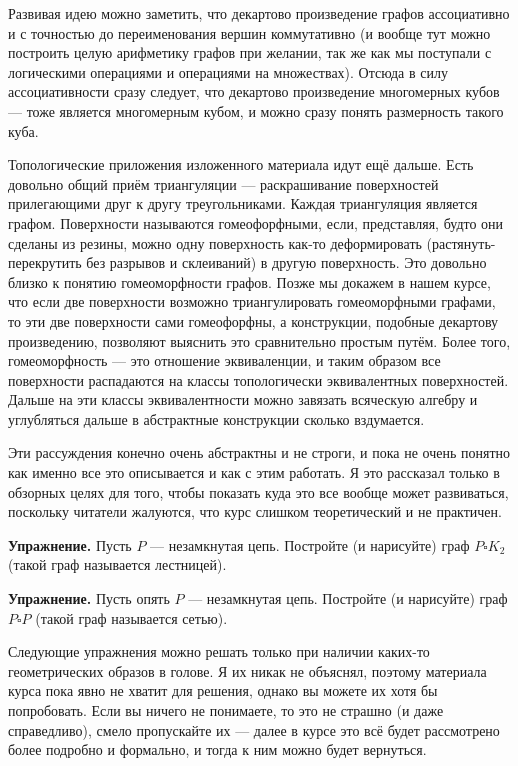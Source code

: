 Развивая идею можно заметить, что декартово произведение графов ассоциативно и с точностью до переименования вершин коммутативно (и вообще тут можно построить целую арифметику графов при желании, так же как мы поступали с логическими операциями и операциями на множествах). Отсюда в силу ассоциативности сразу следует, что декартово произведение многомерных кубов — тоже является многомерным кубом, и можно сразу понять размерность такого куба.

Топологические приложения изложенного материала идут ещё дальше. Есть довольно общий приём триангуляции — раскрашивание поверхностей прилегающими друг к другу треугольниками. Каждая триангуляция является графом. Поверхности называются гомеофорфными, если, представляя, будто они сделаны из резины, можно одну поверхность как-то деформировать (растянуть-перекрутить без разрывов и склеиваний) в другую поверхность. Это довольно близко к понятию гомеоморфности графов. Позже мы докажем в нашем курсе, что если две поверхности возможно триангулировать гомеоморфными графами, то эти две поверхности сами гомеофорфны, а конструкции, подобные декартову произведению, позволяют выяснить это сравнительно простым путём. Более того, гомеоморфность — это отношение эквиваленции, и таким образом все поверхности распадаются на классы топологически эквивалентных поверхностей. Дальше на эти классы эквивалентности можно завязать всяческую алгебру и углубляться дальше в абстрактные конструкции сколько вздумается.

Эти рассуждения конечно очень абстрактны и не строги, и пока не очень понятно как именно все это описывается и как с этим работать. Я это рассказал только в обзорных целях для того, чтобы показать куда это все вообще может развиваться, поскольку читатели жалуются, что курс слишком теоретический и не практичен.

{\bfseries Упражнение.} Пусть $P$ — незамкнутая цепь. Постройте (и нарисуйте) граф $P\square K_2$ (такой граф называется лестницей).

{\bfseries Упражнение.} Пусть опять $P$ — незамкнутая цепь. Постройте (и нарисуйте) граф $P\square P$ (такой граф называется сетью).

Следующие упражнения можно решать только при наличии каких-то геометрических образов в голове. Я их никак не объяснял, поэтому материала курса пока явно не хватит для решения, однако вы можете их хотя бы попробовать. Если вы ничего не понимаете, то это не страшно (и даже справедливо), смело пропускайте их — далее в курсе это всё будет рассмотрено более подробно и формально, и тогда к ним можно будет вернуться.

